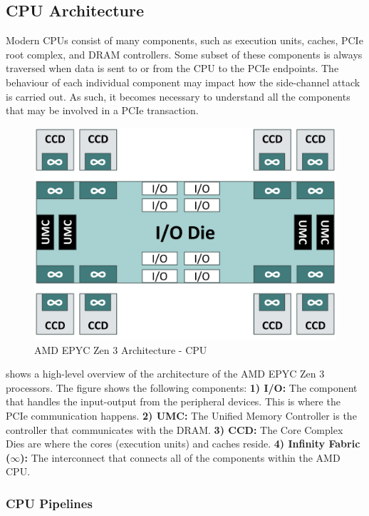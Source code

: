 \subsection{CPU Architecture}
\label{subsec:interconnect-sc-background-cpu-arch}

Modern CPUs consist of many components, such as execution units, caches, PCIe root complex, and DRAM controllers.
Some subset of these components is always traversed when data is sent to or from the CPU to the PCIe endpoints.
The behaviour of each individual component may impact how the side-channel attack is carried out.
As such, it becomes necessary to understand all the components that may be involved in a PCIe transaction.

\begin{figure}[!htb]
    \centering
    \includegraphics[width=\columnwidth]{figures/interconnect-sc/amd_arch/processor.png}
    \caption{AMD EPYC Zen 3 Architecture - CPU}
    \label{fig:amd-cpu}
\end{figure}


 shows a high-level overview of the architecture of the AMD EPYC Zen 3 processors.
The figure shows the following components:
\textbf{1) I/O:} The component that handles the input-output from the peripheral devices. This is where the PCIe communication happens.
\textbf{2) UMC:} The Unified Memory Controller is the controller that communicates with the DRAM.
\textbf{3) CCD:} The Core Complex Dies are where the cores (execution units) and caches reside.
\textbf{4) Infinity Fabric ($\infty$):} The interconnect that connects all of the components within the AMD CPU.

\subsubsection{CPU Pipelines}
\label{subsubsec:interconnect-sc-background-cpu-arch-pipelines}

